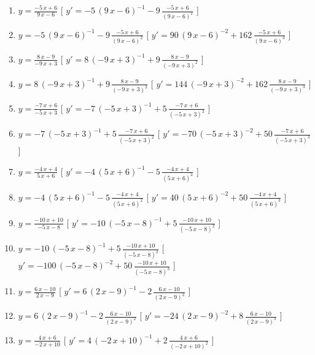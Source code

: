 \begin{esercizio}
\begin{enumerate}
\item $y= {\frac {-5\,x+6}{9\,x-6}} $ \hfill [ $y'= -5\, \left( 9\,x-6 \right) ^{-1}-9\,{\frac {-5\,x+6}{ \left( 9\,x-6 \right) ^{2}}}$ ]
\item $y= -5\, \left( 9\,x-6 \right) ^{-1}-9\,{\frac {-5\,x+6}{ \left( 9\,x-6 \right) ^{2}}} $ \hfill [ $y'= 90\, \left( 9\,x-6 \right) ^{-2}+162\,{\frac {-5\,x+6}{ \left( 9\,x-6 \right) ^{3}}}$ ]
\item $y= {\frac {8\,x-9}{-9\,x+3}} $ \hfill [ $y'= 8\, \left( -9\,x+3 \right) ^{-1}+9\,{\frac {8\,x-9}{ \left( -9\,x+3 \right) ^{2}}}$ ]
\item $y= 8\, \left( -9\,x+3 \right) ^{-1}+9\,{\frac {8\,x-9}{ \left( -9\,x+3 \right) ^{2}}} $ \hfill [ $y'= 144\, \left( -9\,x+3 \right) ^{-2}+162\,{\frac {8\,x-9}{ \left( -9\,x+3 \right) ^{3}}}$ ]
\item $y= {\frac {-7\,x+6}{-5\,x+3}} $ \hfill [ $y'= -7\, \left( -5\,x+3 \right) ^{-1}+5\,{\frac {-7\,x+6}{ \left( -5\,x+3 \right) ^{2}}}$ ]
\item $y= -7\, \left( -5\,x+3 \right) ^{-1}+5\,{\frac {-7\,x+6}{ \left( -5\,x+3 \right) ^{2}}} $ \hfill [ $y'= -70\, \left( -5\,x+3 \right) ^{-2}+50\,{\frac {-7\,x+6}{ \left( -5\,x+3 \right) ^{3}}}$ ]
\item $y= {\frac {-4\,x+4}{5\,x+6}} $ \hfill [ $y'= -4\, \left( 5\,x+6 \right) ^{-1}-5\,{\frac {-4\,x+4}{ \left( 5\,x+6 \right) ^{2}}}$ ]
\item $y= -4\, \left( 5\,x+6 \right) ^{-1}-5\,{\frac {-4\,x+4}{ \left( 5\,x+6 \right) ^{2}}} $ \hfill [ $y'= 40\, \left( 5\,x+6 \right) ^{-2}+50\,{\frac {-4\,x+4}{ \left( 5\,x+6 \right) ^{3}}}$ ]
\item $y= {\frac {-10\,x+10}{-5\,x-8}} $ \hfill [ $y'= -10\, \left( -5\,x-8 \right) ^{-1}+5\,{\frac {-10\,x+10}{ \left( -5\,x-8 \right) ^{2}}}$ ]
\item $y= -10\, \left( -5\,x-8 \right) ^{-1}+5\,{\frac {-10\,x+10}{ \left( -5\,x-8 \right) ^{2}}} $ \hfill [ $y'= -100\, \left( -5\,x-8 \right) ^{-2}+50\,{\frac {-10\,x+10}{ \left( -5\,x-8 \right) ^{3}}}$ ]
\item $y= {\frac {6\,x-10}{2\,x-9}} $ \hfill [ $y'= 6\, \left( 2\,x-9 \right) ^{-1}-2\,{\frac {6\,x-10}{ \left( 2\,x-9 \right) ^{2}}}$ ]
\item $y= 6\, \left( 2\,x-9 \right) ^{-1}-2\,{\frac {6\,x-10}{ \left( 2\,x-9 \right) ^{2}}} $ \hfill [ $y'= -24\, \left( 2\,x-9 \right) ^{-2}+8\,{\frac {6\,x-10}{ \left( 2\,x-9 \right) ^{3}}}$ ]
\item $y= {\frac {4\,x+6}{-2\,x+10}} $ \hfill [ $y'= 4\, \left( -2\,x+10 \right) ^{-1}+2\,{\frac {4\,x+6}{ \left( -2\,x+10 \right) ^{2}}}$ ]

\end{enumerate}
\end{esercizio}
